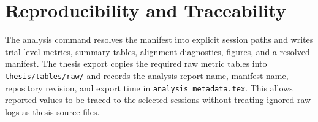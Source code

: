 \section{Reproducibility and Traceability}
The analysis command resolves the manifest into explicit session paths and
writes trial-level metrics, summary tables, alignment diagnostics, figures,
and a resolved manifest. The thesis export copies the required raw metric
tables into \texttt{thesis/tables/raw/} and records the analysis report name,
manifest name, repository revision, and export time in
\texttt{analysis\_metadata.tex}. This allows reported values to be traced to
the selected sessions without treating ignored raw logs as thesis source
files.
